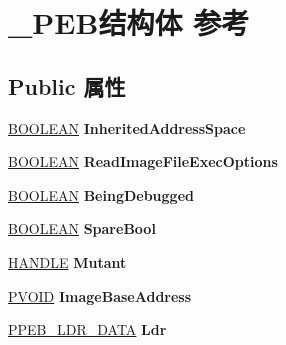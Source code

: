 \hypertarget{struct___p_e_b}{}\section{\+\_\+\+P\+E\+B结构体 参考}
\label{struct___p_e_b}
\subsection*{Public 属性}
\begin{DoxyCompactItemize}
\item 
\mbox{\label{struct___p_e_b_add63778dad853edd656b214369ce8291}} 
\hyperlink{_processor_bind_8h_a112e3146cb38b6ee95e64d85842e380a}{B\+O\+O\+L\+E\+AN} {\bfseries Inherited\+Address\+Space}
\item 
\mbox{\label{struct___p_e_b_a25b70da3929d5b938505ab02ce2db36c}} 
\hyperlink{_processor_bind_8h_a112e3146cb38b6ee95e64d85842e380a}{B\+O\+O\+L\+E\+AN} {\bfseries Read\+Image\+File\+Exec\+Options}
\item 
\mbox{\label{struct___p_e_b_aaaa08e502577f755193e7d3f2da10bd8}} 
\hyperlink{_processor_bind_8h_a112e3146cb38b6ee95e64d85842e380a}{B\+O\+O\+L\+E\+AN} {\bfseries Being\+Debugged}
\item 
\mbox{\label{struct___p_e_b_adb38529ff5d253e00d7a55ac9c105ade}} 
\hyperlink{_processor_bind_8h_a112e3146cb38b6ee95e64d85842e380a}{B\+O\+O\+L\+E\+AN} {\bfseries Spare\+Bool}
\item 
\mbox{\label{struct___p_e_b_ab069c7b17abf39b2f6f521a36e6154de}} 
\hyperlink{interfacevoid}{H\+A\+N\+D\+LE} {\bfseries Mutant}
\item 
\mbox{\label{struct___p_e_b_a4689f1d1d2f23df970b34756abc837ed}} 
\hyperlink{interfacevoid}{P\+V\+O\+ID} {\bfseries Image\+Base\+Address}
\item 
\mbox{\label{struct___p_e_b_a29c84508296ee2568339d06368fbaf70}} 
\hyperlink{struct___p_e_b___l_d_r___d_a_t_a}{P\+P\+E\+B\+\_\+\+L\+D\+R\+\_\+\+D\+A\+TA} {\bfseries Ldr}
\item 
\mbox{\label{struct___p_e_b_aacb2fd9b49dd2f29cf5f751887b1f9e5}} 

\end{DoxyCompactItemize}
